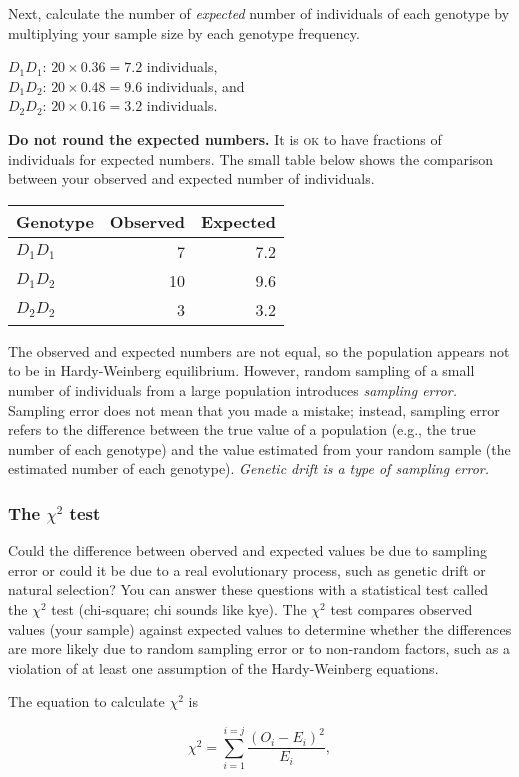 \documentclass[12pt]{exam}
\begin{document}
\begin{questions}
Next, calculate the number of \emph{expected} number of individuals of each 
genotype by multiplying your sample size by each genotype frequency.

$D_1D_1$: $20 \times 0.36 = 7.2$ individuals,\\
$D_1D_2$: $20 \times 0.48 = 9.6$ individuals, and\\
$D_2D_2$: $20 \times 0.16 = 3.2$ individuals.

\textbf{Do not round the expected numbers.} It is \textsc{ok} to have 
fractions of individuals for expected numbers. The small table below 
shows the comparison between your observed and expected number of individuals.

\begin{longtable}{lrr}
	\toprule
	Genotype	& Observed	& Expected \tabularnewline
	\midrule
	$D_1D_1$ & 7  & 7.2 \tabularnewline
	$D_1D_2$ & 10 & 9.6 \tabularnewline
	$D_2D_2$ & 3  & 3.2 \tabularnewline
	\bottomrule
\end{longtable}	

The observed and expected numbers are not equal, so the population appears not 
to be in Hardy-Weinberg equilibrium. However, random sampling of a small number 
of individuals from a large population introduces \emph{sampling error.} Sampling 
error does not mean that you made a mistake; instead, sampling error refers to 
the difference between the true value of a population (e.g., the true number of 
each genotype) and the value estimated from your random sample (the estimated 
number of each genotype). \emph{Genetic drift is a type of sampling error.}

\subsubsection*{The $\chi^2$ test}

Could the difference between oberved and expected values be due to sampling 
error or could it be due to a real evolutionary process, such as genetic drift 
or natural selection? You can answer these questions with a statistical test 
called the $\chi^2$ test (chi-square; chi sounds like kye). The $\chi^2$ test 
compares observed values (your sample) against expected values to determine 
whether the differences are more likely due to random sampling error or to 
non-random factors, such as a violation of at least one assumption of the 
Hardy-Weinberg equations.
 
The equation to calculate $\chi^2$ is 

\[\chi^2 = \sum_{i=1}^{i=j}\frac{(O_i - E_i)^2}{E_i}, \]


\end{questions}
\end{document}
